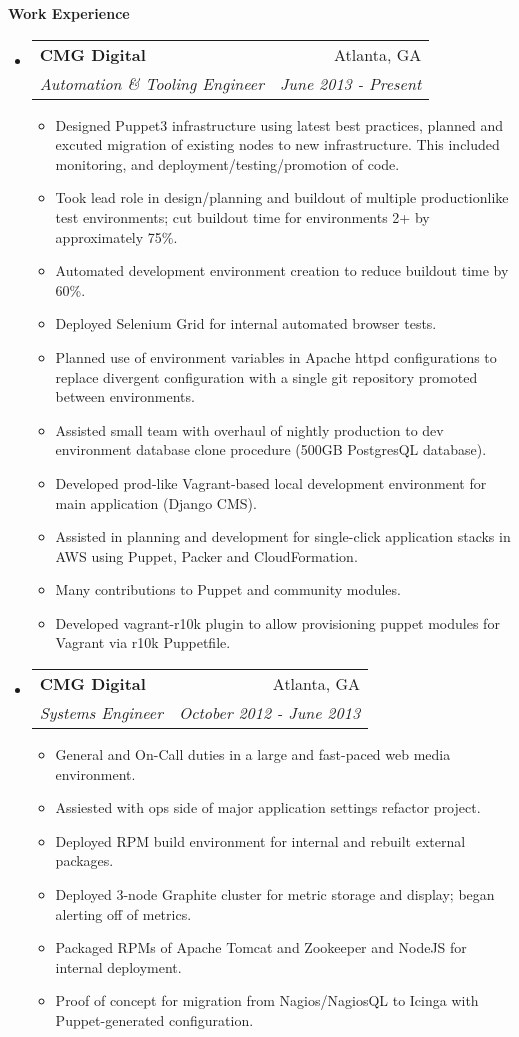 \documentclass[letterpaper,11pt]{article}
\makeatletter
\newcommand{\resitem}[1]{\item #1 \vspace{-2pt}}
\newcommand{\resheading}[1]{{\large \colorbox{mygrey}{\begin{minipage}{\textwidth}{\textbf{#1 \vphantom{p\^{E}}}}\end{minipage}}}}
\newcommand{\ressubheading}[4]{
\begin{tabular*}{7.0in}{l@{\extracolsep{\fill}}r}
		\textbf{#1} & #2 \\
		\textit{#3} & \textit{#4} \\
\end{tabular*}\vspace{-6pt}}
\makeatother
\begin{document}
\resheading{Work Experience}
\begin{itemize}
\item
	\ressubheading{CMG Digital}{Atlanta, GA}{Automation \& Tooling Engineer}{June 2013 - Present}
	\begin{itemize}
                \resitem{Designed Puppet3 infrastructure using latest best practices, planned and excuted migration of existing nodes to new infrastructure. This included monitoring, and deployment/testing/promotion of code.}
                \resitem{Took lead role in design/planning and buildout of multiple production\-like test environments; cut buildout time for environments 2+ by approximately 75\%.}
                \resitem{Automated development environment creation to reduce buildout time by 60\%.}
                \resitem{Deployed Selenium Grid for internal automated browser tests.}
                \resitem{Planned use of environment variables in Apache httpd configurations to replace divergent configuration with a single git repository promoted between environments.}
                \resitem{Assisted small team with overhaul of nightly production to dev environment database clone procedure (500GB PostgresQL database).}
                \resitem{Developed prod-like Vagrant-based local development environment for main application (Django CMS).}
                \resitem{Assisted in planning and development for single-click application stacks in AWS using Puppet, Packer and CloudFormation.}
                \resitem{Many contributions to Puppet and community modules.}
                \resitem{Developed vagrant-r10k plugin to allow provisioning puppet modules for Vagrant via r10k Puppetfile.}
	\end{itemize}

\item
	\ressubheading{CMG Digital}{Atlanta, GA}{Systems Engineer}{October 2012 - June 2013}
	\begin{itemize}
                \resitem{General and On-Call duties in a large and fast-paced web media environment.}
                \resitem{Assiested with ops side of major application settings refactor project.}
                \resitem{Deployed RPM build environment for internal and rebuilt external packages.}
                \resitem{Deployed 3-node Graphite cluster for metric storage and display; began alerting off of metrics.}
                \resitem{Packaged RPMs of Apache Tomcat and Zookeeper and NodeJS for internal deployment.}
                \resitem{Proof of concept for migration from Nagios/NagiosQL to Icinga with Puppet-generated configuration.}
	\end{itemize}


\end{itemize}
\end{document}
